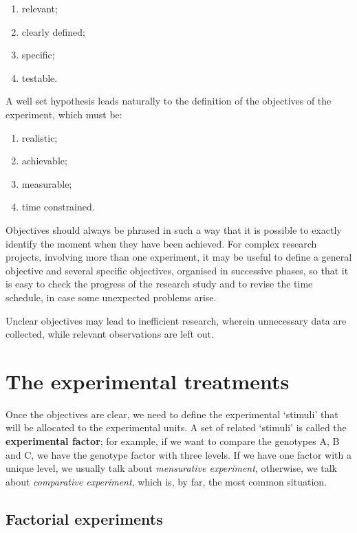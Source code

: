 \documentclass[a4paper,12pt,oneside]{book}
\providecommand{\tightlist}{%
  \setlength{\itemsep}{0pt}\setlength{\parskip}{0pt}}
\begin{document}
\begin{enumerate}
\def\labelenumi{\arabic{enumi}.}
\tightlist
\item
  relevant;
\item
  clearly defined;
\item
  specific;
\item
  testable.
\end{enumerate}

A well set hypothesis leads naturally to the definition of the objectives of the experiment, which must be:

\begin{enumerate}
\def\labelenumi{\arabic{enumi}.}
\tightlist
\item
  realistic;
\item
  achievable;
\item
  measurable;
\item
  time constrained.
\end{enumerate}

Objectives should always be phrased in such a way that it is possible to exactly identify the moment when they have been achieved. For complex research projects, involving more than one experiment, it may be useful to define a general objective and several specific objectives, organised in successive phases, so that it is easy to check the progress of the research study and to revise the time schedule, in case some unexpected problems arise.

Unclear objectives may lead to inefficient research, wherein unnecessary data are collected, while relevant observations are left out.

\hypertarget{the-experimental-treatments}{%
\section{The experimental treatments}\label{the-experimental-treatments}}

Once the objectives are clear, we need to define the experimental `stimuli' that will be allocated to the experimental units. A set of related `stimuli' is called the \textbf{experimental factor}; for example, if we want to compare the genotypes A, B and C, we have the genotype factor with three levels. If we have one factor with a unique level, we usually talk about \emph{mensurative experiment}, otherwise, we talk about \emph{comparative experiment}, which is, by far, the most common situation.

\hypertarget{factorial-experiments}{%
\subsection{Factorial experiments}\label{factorial-experiments}}
\end{document}

